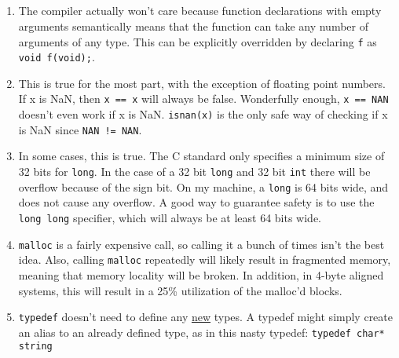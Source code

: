 \documentclass[a4paper,11pt]{article}
\def\code#1{\texttt{#1}}
\begin{document}
\subsection{}
\begin{enumerate}[label = (\alph*)]
  \item
    The compiler actually won't care because function declarations with empty arguments
    semantically means that the function can take any number of arguments of any type.
    This can be explicitly overridden by declaring \code{f} as \code{void f(void);}.
  \item
    This is true for the most part, with the exception of floating point numbers.
    If x is NaN, then \code{x == x} will always be false.
    Wonderfully enough, \code{x == NAN} doesn't even work if x is NaN.
    \code{isnan(x)} is the only safe way of checking if x is NaN since \code{NAN != NAN}.
  \item
    In some cases, this is true.
    The C standard only specifies a minimum size of 32 bits for \code{long}.
    In the case of a 32 bit \code{long} and 32 bit \code{int} there will be overflow because
    of the sign bit.
    On my machine, a \code{long} is 64 bits wide, and does not cause any overflow.
    A good way to guarantee safety is to use the \code{long long} specifier, which will always
    be at least 64 bits wide.
  \item
    \code{malloc} is a fairly expensive call, so calling it a bunch of times isn't the best idea.
    Also, calling \code{malloc} repeatedly will likely result in fragmented memory, meaning
    that memory locality will be broken.
    In addition, in 4-byte aligned systems, this will result in a 25\% utilization of the
    malloc'd blocks.
  \item
    \code{typedef} doesn't need to define any \underline{new} types.
    A typedef might simply create an alias to an already defined type, as in this nasty typedef:
    \code{typedef char* string}
\end{enumerate}
\end{document}
